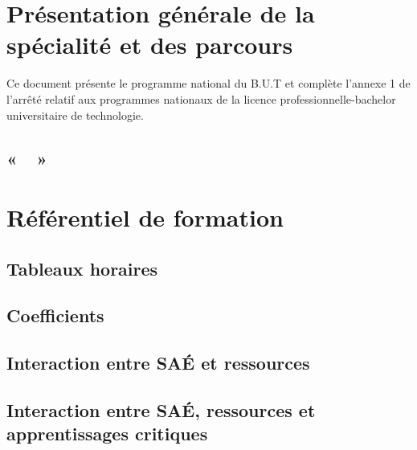 \documentclass[10pt]{article}
\newcommand{\selectallparcours}{\def\leparcours{\VAR{data.getParcours().getCanonical()|le}}}
\begin{document}
\newpage
\section[Présentation générale]{Présentation générale de la spécialité et des parcours}
Ce document présente le programme national du B.U.T 
et complète l’annexe 1 de l’arrêté relatif aux programmes nationaux de
la licence professionnelle-bachelor universitaire de technologie.




\subsection*{ «~~»}


\selectallparcours
\newpage
\section{Référentiel de formation}
\subsection{Tableaux horaires}
\selectallparcours
\newpage
\subsection{Coefficients}
\newpage
\subsection{Interaction entre SAÉ et ressources}
\newpage
\subsection{Interaction entre SAÉ, ressources et apprentissages critiques}
\end{document}
